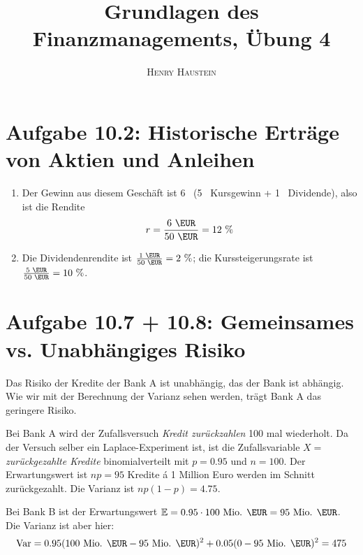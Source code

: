 \documentclass{article}
\title{\textbf{Grundlagen des Finanzmanagements, Übung 4}}
\author{\textsc{Henry Haustein}}
\date{}
\newcommand{\E}{\mathbb{E}}
\DeclareMathOperator{\Var}{Var}
\begin{document}
	\maketitle
	
	\section*{Aufgabe 10.2: Historische Erträge von Aktien und Anleihen}
	\begin{enumerate}[label=(\alph*)]
		\item Der Gewinn aus diesem Geschäft ist 6 \EUR\, (5 \EUR\, Kursgewinn + 1 \EUR\, Dividende), also ist die Rendite
		\begin{align}
			r = \frac{6\text{ \EUR}}{50\text{ \EUR}} = 12\text{ \%} \notag
		\end{align}
		\item Die Dividendenrendite ist $\frac{1\text{ \EUR}}{50\text{ \EUR}} = 2\text{ \%}$; die Kurssteigerungsrate ist $\frac{5\text{ \EUR}}{50\text{ \EUR}}=10\text{ \%}$.
	\end{enumerate}

	\section*{Aufgabe 10.7 + 10.8: Gemeinsames vs. Unabhängiges Risiko}
	Das Risiko der Kredite der Bank A ist unabhängig, das der Bank ist abhängig. Wie wir mit der Berechnung der Varianz sehen werden, trägt Bank A das geringere Risiko.
	
	Bei Bank A wird der Zufallsversuch \textit{Kredit zurückzahlen} 100 mal wiederholt. Da der Versuch selber ein Laplace-Experiment ist, ist die Zufallsvariable $X = $ \textit{zurückgezahlte Kredite} binomialverteilt mit $p=0.95$ und $n=100$. Der Erwartungswert ist $np=95$ Kredite á 1 Million Euro werden im Schnitt zurückgezahlt. Die Varianz ist $np(1-p)=4.75$.
	
	Bei Bank B ist der Erwartungswert $\E=0.95\cdot 100\text{ Mio. \EUR} = 95\text{ Mio. \EUR}$. Die Varianz ist aber hier:
	\begin{align}
		\Var = 0.95(100\text{ Mio. \EUR} - 95\text{ Mio. \EUR})^2 + 0.05(0-95\text{ Mio. \EUR})^2 = 475 \notag
	\end{align}
	
\end{document}

